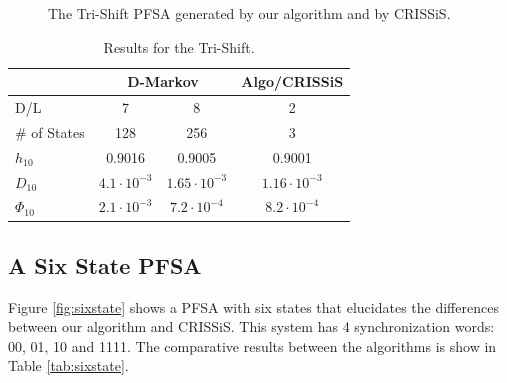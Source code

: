 {\begin{figure}
\centering
{}
\caption{The Tri-Shift PFSA generated by our algorithm and by CRISSiS.\label{fig:trishiftgen}}
\end{figure}

\begin{table}
\centering
\begin{tabular}{|l|c|c|c|}
\hline
 & \multicolumn{2}{c|}{\textbf{D-Markov}} & \textbf{Algo/CRISSiS}\\
 \hline
D/L & 7 & 8 & 2 \\
\hline
\# of States & 128 & 256 & 3 \\ 
$h_{10}$ & 0.9016 & 0.9005 & 0.9001 \\
$D_{10}$ & $4.1\cdot10^{-3}$ & $1.65\cdot10^{-3}$ & $1.16\cdot10^{-3}$ \\
$\Phi_{10}$ & $2.1\cdot10^{-3}$ & $7.2\cdot10^{-4}$ & $8.2\cdot10^{-4}$ \\
 \hline
\end{tabular}
\caption{Results for the Tri-Shift. \label{tab:trishift}}
\end{table}

\subsection{A Six State PFSA}

Figure \ref{fig:sixstate} shows a PFSA with six states that elucidates the differences between our algorithm and CRISSiS. This system has 4 synchronization words: 00, 01, 10 and 1111. The comparative results between the algorithms is show in Table \ref{tab:sixstate}.

}
